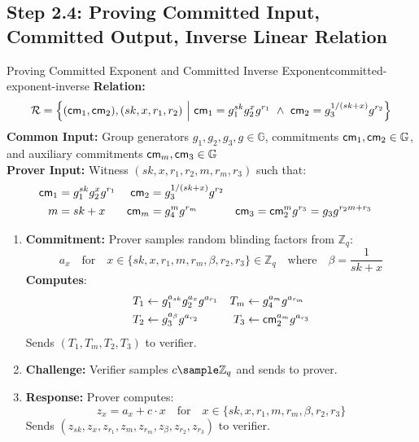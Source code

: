 \newpage
\subsection{Step 2.4: Proving Committed Input, Committed Output, Inverse Linear Relation}

\begin{protocol}{Proving Committed Exponent and Committed Inverse Exponent}{committed-exponent-inverse}\label{pok-committed-exponent-inverse}
\textbf{Relation: }
\[
\mathcal{R} = \left\{ (\mathsf{cm}_1, \mathsf{cm}_2), (sk, x, r_1, r_2) \ \middle|\ \mathsf{cm}_1 = g_1^{sk} g_2^{x} g^{r_1} \ \land\ \mathsf{cm}_2 = g_3^{1/(sk + x)} g^{r_2} \right\}
\]
\textbf{Common Input:} Group generators $g_1, g_2, g_3, g \in \mathbb{G}$, commitments $\mathsf{cm}_1, \mathsf{cm}_2 \in \mathbb{G}$, and auxiliary commitments $\mathsf{cm}_m, \mathsf{cm}_3 \in \mathbb{G}$\\
\textbf{Prover Input:} Witness $(sk, x, r_1, r_2, m, r_m, r_3)$ such that:
    \begin{align*}
        \mathsf{cm}_1 &= g_1^{sk} g_2^{x} g^{r_1} & \mathsf{cm}_2 &= g_3^{1/(sk + x)} g^{r_2} \\
        m &= sk + x & \mathsf{cm}_m &= g_4^{m} g^{r_m} & \mathsf{cm}_3 &= \mathsf{cm}_2^{m} g^{r_3} = g_3 g^{r_2 m + r_3}
    \end{align*}
\begin{enumerate}
    \item \textbf{Commitment:} Prover samples random blinding factors from $\mathbb{Z}_q$:
       \[
        a_x \quad \text{for} \quad x \in \{ sk, x, r_1, m, r_m, \beta, r_2, r_3 \} \in \mathbb{Z}_q \quad \text{where} \quad \beta = \frac{1}{sk + x}
       \]
    \textbf{Computes}:
    \begin{align*}
        T_1 &\gets g_1^{a_{sk}} g_2^{a_x} g^{a_{r_1}} & T_m &\gets g_4^{a_m} g^{a_{r_m}} \\
        T_2 &\gets g_3^{a_\beta} g^{a_{r_2}} & T_3 &\gets \mathsf{cm}_2^{a_m} g^{a_{r_3}}
    \end{align*}
    Sends $(T_1, T_m, T_2, T_3)$ to verifier.
    
    \item \textbf{Challenge:} Verifier samples $c \sample \mathbb{Z}_q$ and sends to prover.
    
    \item \textbf{Response:} Prover computes:
    \[
    z_x = a_x + c \cdot x \quad \text{for} \quad x \in \{ sk, x, r_1, m, r_m, \beta, r_2, r_3 \}
    \]
    Sends $(z_{sk}, z_x, z_{r_1}, z_m, z_{r_m}, z_\beta, z_{r_2}, z_{r_3})$ to verifier.
    

\end{enumerate}
\end{protocol}
